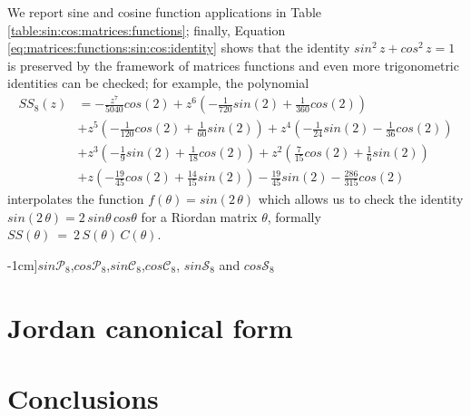 We report sine and cosine function applications in Table
\ref{table:sin:cos:matrices:functions}; finally, Equation
\ref{eq:matrices:functions:sin:cos:identity} shows that the identity
$sin^{2}\,z + cos^{2}\,z=1$ is preserved by the framework of matrices functions
and even more trigonometric identities can be checked; for example, the
polynomial
\begin{displaymath}
\begin{split}
{SS_{ 8 }}{\left (z \right )} &= - \frac{z^{7}}{5040} cos{\left (2 \right )} + z^{6} \left(- \frac{1}{720} sin{\left (2 \right )} + \frac{1}{360} cos{\left (2 \right )}\right) \\
    &+ z^{5} \left(- \frac{1}{120} cos{\left (2 \right )} + \frac{1}{60} sin{\left (2 \right )}\right) + z^{4} \left(- \frac{1}{24} sin{\left (2 \right )} - \frac{1}{36} cos{\left (2 \right )}\right) \\
    &+ z^{3} \left(- \frac{1}{9} sin{\left (2 \right )} + \frac{1}{18} cos{\left (2 \right )}\right)  + z^{2} \left(\frac{7}{15} cos{\left (2 \right )} + \frac{1}{6} sin{\left (2 \right )}\right) \\
    &+ z \left(- \frac{19}{45} cos{\left (2 \right )} + \frac{14}{15} sin{\left (2 \right )}\right) - \frac{19}{45} sin{\left (2 \right )} - \frac{286}{315} cos{\left (2 \right )}
\end{split}
\end{displaymath}
interpolates the function $f(\theta)=sin(2\,\theta)$
which allows us to check the identity $sin(2\,\theta)=2\,sin\theta\,cos\theta$ 
for a Riordan matrix $\theta$, formally $SS(\theta)~=~2\,S(\theta)\,C(\theta)$.

\iffalse
In the same spirit, many other functions and their relations with already
studied ones could be an interesting field of investigation -- we would recall
that before starting the lifting process of a scalar function, the user
has to pay attention to the correct definition of the generalized Lagrange base
because it all depends on the eigenvalues of the matrix under study.
\fi

\vfill

\begin{table}
    \caption[][-1cm]{$sin{\mathcal{P}_{8}}$,$cos{\mathcal{P}_{8}}$,$sin{\mathcal{C}_{8}}$,$cos{\mathcal{C}_{8}}$,
$sin{\mathcal{S}_{8}}$ and $cos{\mathcal{S}_{8}}$}

\label{table:sin:cos:matrices:functions}
\end{table}


\section{Jordan canonical form}




\vfill

\section{Conclusions}








